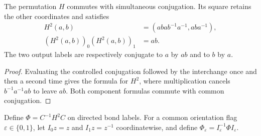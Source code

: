 \begin{lemma}%
    \label{thm:peps_regular_two_cycle_exchange}
    \leanok
    The permutation $H$ commutes with simultaneous conjugation.
    Its square retains the other coordinates and satisfies
    \begin{align}
        H^2(a,b)                 & =(abab^{-1}a^{-1},aba^{-1}), \\
        (H^2(a,b))_0(H^2(a,b))_1 & =ab.
    \end{align}
    The two output labels are respectively conjugate to $a$ by $ab$ and to
    $b$ by $a$.
\end{lemma}
\begin{proof}\leanok
    Evaluating the controlled conjugation followed by the interchange once
    and then a second time gives the formula for $H^2$, where multiplication
    cancels $b^{-1}a^{-1}ab$ to leave $ab$. Both component formulas commute with
    common conjugation.
\end{proof}

\begin{definition}%
    \label{def:peps_regular_three_plaquette_double_exchange}
    \leanok
    Define $\Phi=C^{-1}H^2C$ on directed bond labels.
    For a common orientation flag $\varepsilon\in\{0,1\}$, let
    $I_0z=z$ and $I_1z=z^{-1}$ coordinatewise, and define
    $\Phi_\varepsilon=I_\varepsilon^{-1}\Phi I_\varepsilon$.
\end{definition}

